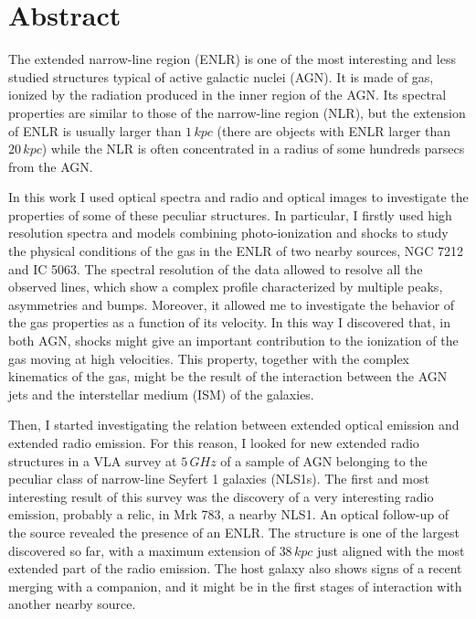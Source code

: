 \documentclass[../main.tex]{subfiles}
\begin{document}
\clearpage

\chapter*{Abstract}

The extended narrow-line region (ENLR) is one of the most interesting and less studied structures typical of active galactic nuclei (AGN).
It is made of gas, ionized by the radiation produced in the inner region of the AGN.
Its spectral properties are similar to those of the narrow-line region (NLR), but the extension of ENLR is usually larger than $1\,\si{kpc}$ (there are objects with ENLR larger than $20\,\si{kpc}$) while the NLR is often concentrated in a radius of some hundreds parsecs from the AGN.  

In this work I used optical spectra and radio and optical images to investigate the properties of some of these peculiar structures.
In particular, I firstly used high resolution spectra and models combining photo-ionization and shocks to study the physical conditions of the gas in the ENLR of two nearby sources, NGC 7212 and IC 5063.
The spectral resolution of the data allowed to resolve all the observed lines, which show a complex profile characterized by multiple peaks, asymmetries and bumps.
Moreover, it allowed me to investigate the behavior of the gas properties as a function of its velocity.
In this way I discovered that, in both AGN, shocks might give an important contribution to the ionization of the gas moving at high velocities. 
This property, together with the complex kinematics of the gas, might be the result of the interaction between the AGN jets and the interstellar medium (ISM) of the galaxies.

Then, I started investigating the relation between extended optical emission and extended radio emission.
For this reason, I looked for new extended radio structures in a VLA survey at $5\,\si{GHz}$ of a sample of AGN belonging to the peculiar class of narrow-line Seyfert 1 galaxies (NLS1s). 
The first and most interesting result of this survey was the discovery of a very interesting radio emission, probably a relic, in Mrk 783, a nearby NLS1.
An optical follow-up of the source revealed the presence of an ENLR.
The structure is one of the largest discovered so far, with a maximum extension of $38\,\si{kpc}$ just aligned with the most extended part of the radio emission.
The host galaxy also shows signs of a recent merging with a companion, and it might be in the first stages of interaction with another nearby source.
\end{document}
